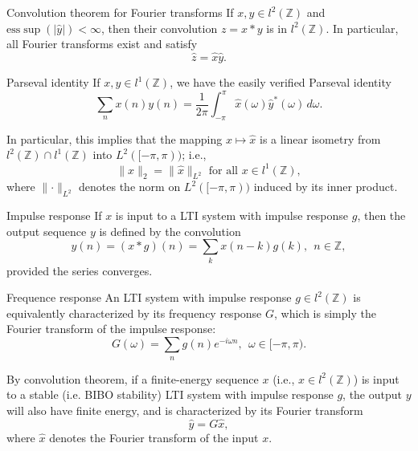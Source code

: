 \documentclass{article}
\begin{document}
\begin{thrm}{Convolution theorem for Fourier transforms}{}
If \( x,y \in l^2(\mathbb{Z} ) \) and \( \mathrm{ess}\sup (\left\lvert \hat{y}  \right\rvert ) < \infty  \), then their convolution \( z = x \ast y \) is in \( l^2(\mathbb{Z} ) \). In particular, all Fourier transforms exist and satisfy 
\[
    \hat{z} = \hat{x} \hat{y} . 
\]
\end{thrm}



\begin{misc}{Parseval identity}{}
If \( x,y \in l^1(\mathbb{Z} ) \), we have the easily verified Parseval identity
\[
    \sum_{n} x(n)y(n) = \frac{1}{2\pi }\int_{- \pi }^{\pi} \hat{x} (\omega )\hat{y} ^{\ast}(\omega )   \,d \omega  .
\]

In particular, this implies that the mapping \( x\mapsto \hat{x}   \) is a linear isometry from \( l^2(\mathbb{Z} ) \cap l^1 (\mathbb{Z} ) \) into \( L^2([-\pi, \pi )) \); i.e., 
\[
    \lVert x \rVert _2 = \lVert \hat{x}  \rVert _{L^2} \text{ for all } x \in  l^1(\mathbb{Z} ),
\] where \( \lVert \cdot  \rVert_{L^2}  \) denotes the norm on \( L^2([- \pi ,\pi )) \) induced by its inner product. 
\end{misc}


\begin{defn}{Impulse response}{}
    If \( x \) is input to a LTI system with impulse response \( g \), then the output sequence \( y \) is defined by the convolution 
    \[
        y(n) = (x \ast g)(n) = \sum_{k} x(n - k)g(k), \ \ n \in \mathbb{Z} ,
    \]
    provided the series converges. 
    \end{defn}
    
\begin{defn}{Frequence response}{}
An LTI system with impulse response \( g \in l^2(\mathbb{Z} ) \) is equivalently characterized by its frequency response \( G \), which is simply the Fourier transform of the impulse response:
\[
    G(\omega ) = \sum_{n} g(n)e^{- i \omega n}, \ \ \omega \in [- \pi , \pi ). 
\]
\end{defn}    
\begin{rmk}{}{}
    By convolution theorem, if a finite-energy sequence \( x \) (i.e., \( x\in l^2(\mathbb{Z} ) \)) is input to a stable (i.e. BIBO stability) LTI system with impulse response \( g \), the output \( y \) will also have finite energy, and is characterized by its Fourier transform
    \[
        \hat{y} = G \hat{x},
    \]
    where \( \hat{x}  \) denotes the Fourier transform of the input \( x \). 
\end{rmk}
\end{document}
